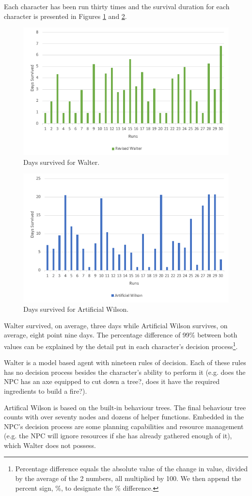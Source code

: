 Each character has been run thirty times and the survival duration for each character is presented in Figures \ref{fig:days-survived-walter} and \ref{fig:days-survived-wilson}.

\begin{figure}
  \includegraphics[width=.4\textwidth]{./Images/days-survived-walter-new-and-improved}
  \caption{Days survived for Walter.}
  \label{fig:days-survived-walter}
\end{figure}

\begin{figure}
  \includegraphics[width=.4\textwidth]{./Images/days-survived-wilson}
  \caption{Days survived for Artificial Wilson.}
  \label{fig:days-survived-wilson}
\end{figure}

Walter survived, on average, three days while Artificial Wilson survives, on average, eight point nine days.
The percentage difference of 99\% between both values can be explained by the detail put in each character's decision process\footnote{Percentage difference equals the absolute value of the change in value, divided by the average of the 2 numbers, all multiplied by 100. We then append the percent sign, \%, to designate the \% difference.}.

Walter is a model based agent with nineteen rules of decision.
Each of these rules has no decision process besides the character's ability to perform it (e.g. does the NPC has an axe equipped to cut down a tree?, does it have the required ingredients to build a fire?).

Artifical Wilson is based on the built-in behaviour trees.
The final behaviour tree counts with over seventy nodes and dozens of helper functions.
Embedded in the NPC's decision process are some planning capabilities and resource management (e.g. the NPC will ignore resources if she has already gathered enough of it), which Walter does not possess.

